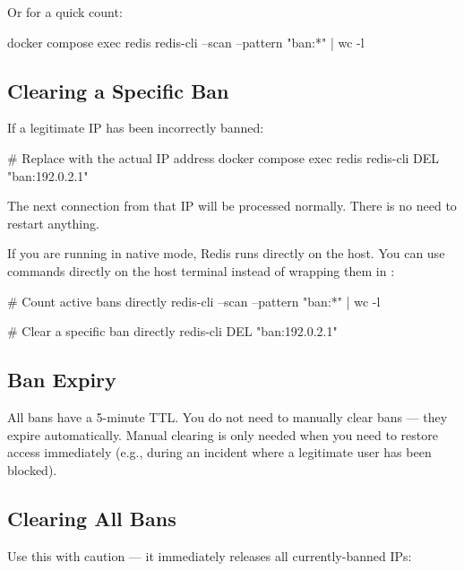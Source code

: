 Or for a quick count:

\begin{bashcode}
docker compose exec redis redis-cli --scan --pattern "ban:*" | wc -l
\end{bashcode}

\subsection{Clearing a Specific Ban}

If a legitimate IP has been incorrectly banned:

\begin{bashcode}
# Replace with the actual IP address
docker compose exec redis redis-cli DEL "ban:192.0.2.1"
\end{bashcode}

The next connection from that IP will be processed normally. There is no need
to restart anything.

\begin{notebox}
If you are running in native mode, Redis runs directly on the host. You can use  commands directly on the host terminal instead of wrapping them in :
\begin{bashcode}
# Count active bans directly
redis-cli --scan --pattern "ban:*" | wc -l

# Clear a specific ban directly
redis-cli DEL "ban:192.0.2.1"
\end{bashcode}
\end{notebox}

\subsection{Ban Expiry}

All bans have a 5-minute TTL. You do not need to manually clear
bans — they expire automatically. Manual clearing is only needed when you need to
restore access immediately (e.g., during an incident where a legitimate user has been
blocked).

\subsection{Clearing All Bans}

Use this with caution — it immediately releases all currently-banned IPs:

